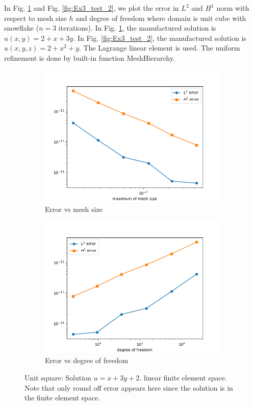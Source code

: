 \documentclass[12pt]{article}%
\theoremstyle{plain}
\numberwithin{equation}{section}
\begin{document}
In Fig. \ref{fig:Ex3_test} and Fig.  \ref{fig:Ex3_test_2}, we plot the error in $L^2$ and $H^1$ norm with respect to mesh size $h$ and degree of freedom where domain is unit cube with snowflake ($n=3$ iterations). In Fig. \ref{fig:Ex3_test}, the manufactured solution is $u(x,y)= 2+x+3y$. In Fig. \ref{fig:Ex3_test_2}, the manufactured solution is $u(x,y,z)= 2+x^2+y$. The Lagrange linear element is used. The uniform refinement is done by built-in function MeshHierarchy.

\begin{figure}[H]%
    \centering
         \begin{subfigure}[h]{0.45\linewidth}
          \caption{Error vs mesh size}
\includegraphics[width=\linewidth]{figures/Ex3/Ex3_test.png}
\end{subfigure}
  \begin{subfigure}[h]{0.45\linewidth}
   \caption{Error vs degree of freedom}
\includegraphics[width=\linewidth]{figures/Ex3/Ex3_test_dof.png}
\end{subfigure}
  \caption{Unit square: Solution $u=x+3y+2$. linear finite element space. Note that only round off error appears here since the solution is in the finite element space.}
  \label{fig:Ex3_test}
 \end{figure}
\end{document}
